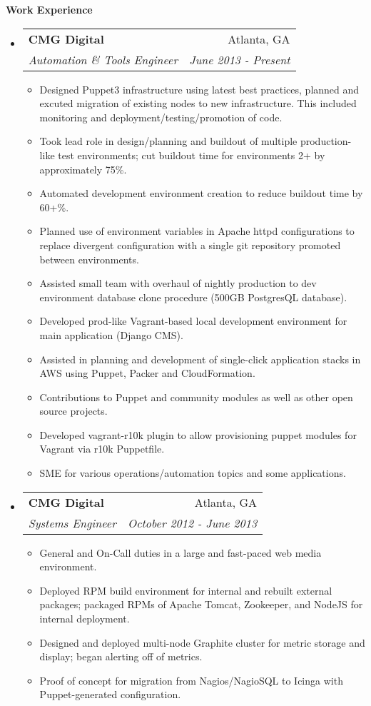 \documentclass[letterpaper,11pt]{article}
\makeatletter
\newcommand{\resitem}[1]{\item #1 \vspace{-2pt}}
\newcommand{\resheading}[1]{{\large \colorbox{mygrey}{\begin{minipage}{\textwidth}{\textbf{#1 \vphantom{p\^{E}}}}\end{minipage}}}}
\newcommand{\ressubheading}[4]{
\begin{tabular*}{7.0in}{l@{\extracolsep{\fill}}r}
		\textbf{#1} & #2 \\
		\textit{#3} & \textit{#4} \\
\end{tabular*}\vspace{-6pt}}
\makeatother
\begin{document}
\resheading{Work Experience}
\begin{itemize}
\item
	\ressubheading{CMG Digital}{Atlanta, GA}{Automation \& Tools Engineer}{June 2013 - Present}
	\begin{itemize}
                \resitem{Designed Puppet3 infrastructure using latest best practices, planned and excuted migration of existing nodes to new infrastructure. This included monitoring and deployment/testing/promotion of code.}
                \resitem{Took lead role in design/planning and buildout of multiple production-like test environments; cut buildout time for environments 2+ by approximately 75\%.}
                \resitem{Automated development environment creation to reduce buildout time by 60+\%.}
                \resitem{Planned use of environment variables in Apache httpd configurations to replace divergent configuration with a single git repository promoted between environments.}
                \resitem{Assisted small team with overhaul of nightly production to dev environment database clone procedure (500GB PostgresQL database).}
                \resitem{Developed prod-like Vagrant-based local development environment for main application (Django CMS).}
                \resitem{Assisted in planning and development of single-click application stacks in AWS using Puppet, Packer and CloudFormation.}
                \resitem{Contributions to Puppet and community modules as well as other open source projects.}
                \resitem{Developed vagrant-r10k plugin to allow provisioning puppet modules for Vagrant via r10k Puppetfile.}
                \resitem{SME for various operations/automation topics and some applications.}
	\end{itemize}

\item
	\ressubheading{CMG Digital}{Atlanta, GA}{Systems Engineer}{October 2012 - June 2013}
	\begin{itemize}
                \resitem{General and On-Call duties in a large and fast-paced web media environment.}
                \resitem{Deployed RPM build environment for internal and rebuilt external packages; packaged RPMs of Apache Tomcat, Zookeeper, and NodeJS for internal deployment.}
                \resitem{Designed and deployed multi-node Graphite cluster for metric storage and display; began alerting off of metrics.}
                \resitem{Proof of concept for migration from Nagios/NagioSQL to Icinga with Puppet-generated configuration.}
	\end{itemize}


\end{itemize}
\end{document}
